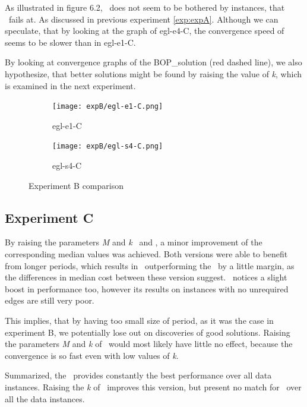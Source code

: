 \documentclass[twoside]{ctuthesis}
\theoremstyle{plain}
\theoremstyle{definition}
\theoremstyle{note}
\begin{document}
As illustrated in figure 6.2, \nnsredge\ does not seem to be bothered by instances, that \nnsrnode\ fails at. As discussed in previous experiment \ref{exp:expA}. Although we can speculate, that by looking at the graph of egl-e4-C, the convergence speed of \nnsredge seems to be slower than in egl-e1-C.

By looking at convergence graphs of the \nnsrbasic BOP\_solution (red dashed line), we also hypothesize, that better solutions might be found by raising the value of \emph{k}, which is examined in the next experiment.

\begin{figure}[htbp]
\label{f:fff}
	\centering
	\begin{subfigure}{0.49\textwidth}
		\centering
		\texttt{[image: expB/egl-e1-C.png]}
		\caption{egl-e1-C}
	\end{subfigure}
	\hfill
	\begin{subfigure}{0.49\textwidth}
		
		\centering
		\texttt{[image: expB/egl-s4-C.png]}
		\caption{egl-s4-C}
	\end{subfigure}
	\caption{Experiment B comparison}
\end{figure}

\subsection{Experiment C}

By raising the parameters \emph{M} and \emph{k} \nnsrbasic\ and \nnsrnode, a minor improvement of the corresponding median values was achieved. Both versions were able to benefit from longer periods, which results in \nnsrbasic\ outperforming the \nnsrvanilla\ by a little margin, as the differences in median cost between these version suggest. \nnsrnode\ notices a slight boost in performance too, however its results on instances with no unrequired edges are still very poor.

This implies, that by having too small size of period, as it was the case in experiment B, we potentially lose out on discoveries of good solutions.
Raising the parameters \emph{M} and \emph{k} of \nnsredge\ would most likely have little no effect, because the convergence is so fast even with low values of \emph{k}.

Summarized, the \nnsredge\ provides constantly the best performance over all data instances. Raising the \emph{k} of \nnsrnode\ improves this version, but present no match for \nnsredge\ over all the data instances.
\end{document}
